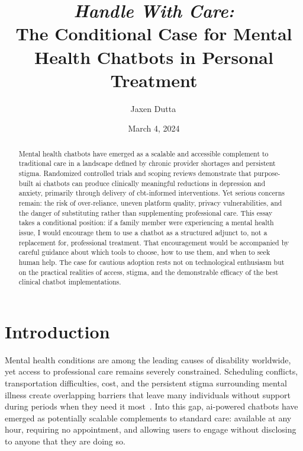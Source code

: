\documentclass[11pt,showkeys]{essay}
\begin{document}
\title{\textit{Handle With Care:}\\
The Conditional Case for Mental Health Chatbots in Personal Treatment}

\author{Jaxen Dutta\, }

\date{March 4, 2024}

\begin{abstract}
Mental health chatbots have emerged as a scalable and accessible complement to traditional care in a landscape defined by chronic provider shortages and persistent stigma. Randomized controlled trials and scoping reviews demonstrate that purpose-built \gls{ai} chatbots can produce clinically meaningful reductions in depression and anxiety, primarily through delivery of \gls{cbt}-informed interventions. Yet serious concerns remain: the risk of over-reliance, uneven platform quality, privacy vulnerabilities, and the danger of substituting rather than supplementing professional care. This essay takes a conditional position: if a family member were experiencing a mental health issue, I would encourage them to use a chatbot as a structured adjunct to, not a replacement for, professional treatment. That encouragement would be accompanied by careful guidance about which tools to choose, how to use them, and when to seek human help. The case for cautious adoption rests not on technological enthusiasm but on the practical realities of access, stigma, and the demonstrable efficacy of the best clinical chatbot implementations.
\end{abstract}


\maketitle

\section{Introduction}

Mental health conditions are among the leading causes of disability worldwide, yet access to professional care remains severely constrained. Scheduling conflicts, transportation difficulties, cost, and the persistent stigma surrounding mental illness create overlapping barriers that leave many individuals without support during periods when they need it most~\cite{vanderschyff_robot_2023}. Into this gap, \gls{ai}-powered chatbots have emerged as potentially scalable complements to standard care: available at any hour, requiring no appointment, and allowing users to engage without disclosing to anyone that they are doing so.
\end{document}
